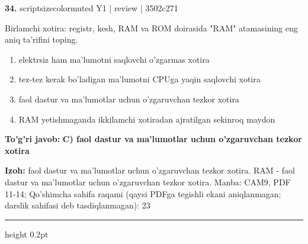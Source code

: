 \documentclass[10pt,a4paper]{article}
\begin{document}
{\bfseries\sffamily\color{ink} 34.} {scriptsizecolor{muted} Y1 | review | 3502c271}
\par
Birlamchi xotira: registr, kesh, RAM va ROM doirasida "RAM" atamasining eng aniq ta'rifini toping.
\begin{enumerate}[label=\Alph*),leftmargin=9mm]
\item elektrsiz ham ma'lumotni saqlovchi o'zgarmas xotira
\item tez-tez kerak bo'ladigan ma'lumotni CPUga yaqin saqlovchi xotira
\item faol dastur va ma'lumotlar uchun o'zgaruvchan tezkor xotira
\item RAM yetishmaganda ikkilamchi xotiradan ajratilgan sekinroq maydon
\end{enumerate}
\begin{tcolorbox}[enhanced,breakable,colback=teal!4,colframe=teal!60!black,boxrule=0.45pt,arc=1.2mm,left=2.7mm,right=2.7mm,top=1.8mm,bottom=1.8mm,before skip=2mm,after skip=2mm]
{\bfseries\sffamily\color{teal}To'g'ri javob:} \textbf{C) faol dastur va ma'lumotlar uchun o'zgaruvchan tezkor xotira}
\par\smallskip
{\bfseries Izoh:} faol dastur va ma'lumotlar uchun o'zgaruvchan tezkor xotira. RAM - faol dastur va ma'lumotlar uchun o'zgaruvchan tezkor xotira. Manba: CAM9, PDF 11-14; Qo'shimcha sahifa raqami (qaysi PDFga tegishli ekani aniqlanmagan; darslik sahifasi deb tasdiqlanmagan): 23
\end{tcolorbox}
\vspace{2mm}\hrule height 0.2pt\vspace{3mm}
\end{document}
